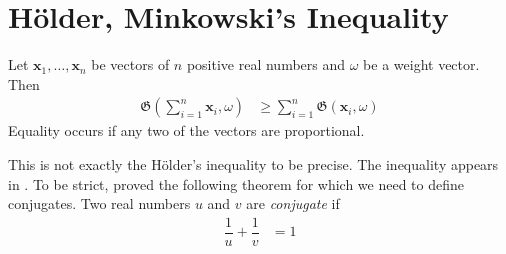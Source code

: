 \documentclass[inequalities.tex]{subfile}
\begin{document}
	
	\section[Holder and Minkowski]{H\"{o}lder, Minkowski's Inequality}\label{sec:holdmink}
	
		\begin{theorem}\label{thm:holder}
			Let $\mathbf{x}_{1},\ldots,\mathbf{x}_{n}$ be vectors of $n$ positive real numbers and $\omega$ be a weight vector. Then
				\begin{align*}
					\mathfrak{G}\left(\sum_{i=1}^{n}\mathbf{x}_{i},\omega\right)
					& \geq \sum_{i=1}^{n}\mathfrak{G}(\mathbf{x}_{i},\omega)
				\end{align*}
			Equality occurs if any two of the vectors are proportional.
		\end{theorem}
	This is not exactly the H\"{o}lder's inequality to be precise. The inequality appears in \textcite[Page $117$]{minkowski_1968}. To be strict, \textcite{holder_1889} proved the following theorem for  which we need to define conjugates. Two real numbers $u$ and $v$ are \textit{conjugate} if
		\begin{align*}
			\dfrac{1}{u}+\dfrac{1}{v}
				& = 1
		\end{align*}
	
\end{document}
